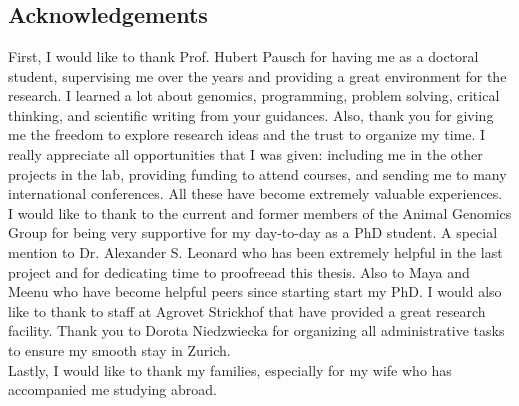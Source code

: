 \documentclass[11 pt, a4paper, notitlepage, twoside]{report}
\begin{document}
\chapter*{}
\singlespacing
{}


\thispagestyle{plain}

\section*{\LARGE{Acknowledgements}}
\bigskip

\normalsize
\onehalfspacing
First, I would like to thank Prof. Hubert Pausch for having me as a doctoral student, 
supervising me over the years and providing a great environment for the research. 
I learned a lot about genomics, programming, problem solving, critical thinking, and scientific writing from your guidances.
Also, thank you for giving me the freedom to explore research ideas and the trust to organize my time. 
I really appreciate all opportunities that I was given: including me in the other projects in the lab, providing funding to attend courses, and sending me to many international conferences. 
All these have become extremely valuable experiences. \\

I would like to thank to the current and former members of the Animal Genomics Group for being very supportive for my day-to-day as a PhD student. 
A special mention to Dr. Alexander S. Leonard who has been extremely helpful in the last project and for dedicating time to proofreead this thesis. 
Also to Maya and Meenu who have become helpful peers since starting start my PhD. 
I would also like to thank to staff at Agrovet Strickhof that have provided a great research facility. 
Thank you to Dorota Niedzwiecka for organizing all administrative tasks to ensure my smooth stay in Zurich.  \\

Lastly, I would like to thank my families, especially for my wife who has accompanied me studying abroad.  

\newpage



\newif\ifincludecv
\includecvtrue %
\ifincludecv
    \newpage
    
\fi
\end{document}

